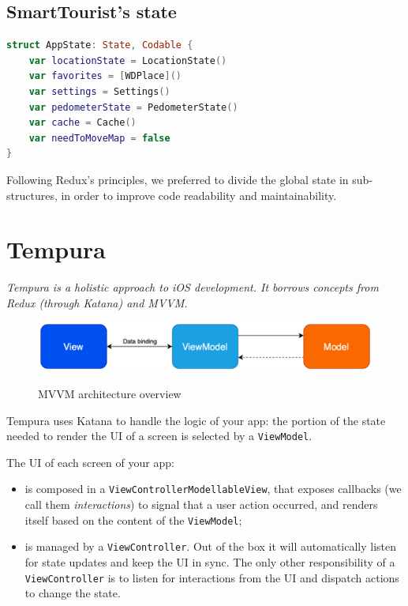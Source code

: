 \documentclass[a4paper, 11pt, parskip=half]{scrreprt}
\theoremstyle{definition}
\newenvironment{linedquote}{
	\begin{mdframed}[style=linedquote]
}{
	\end{mdframed}
}
\begin{document}
\subsection{SmartTourist's state}
		
\begin{lstlisting}[language=swift]
struct AppState: State, Codable {
	var locationState = LocationState()
	var favorites = [WDPlace]()
	var settings = Settings()
	var pedometerState = PedometerState()
	var cache = Cache()
	var needToMoveMap = false
}
\end{lstlisting}

Following Redux's principles, we preferred to divide the global state in sub-structures, in order to improve code readability and maintainability.

\newpage
\section{Tempura}

\begin{linedquote}
    \textit{Tempura is a holistic approach to iOS development. It borrows concepts from Redux (through Katana) and MVVM.}
\end{linedquote}

\begin{figure}[H]
  	\centering
  	\includegraphics[width=0.85\linewidth]{MVVM-light}
  	\label{fig:test1}
	\caption{MVVM architecture overview}
\end{figure}

Tempura uses Katana to handle the logic of your app: the portion of the state needed to render the UI of a screen is selected by a \texttt{ViewModel}.

The UI of each screen of your app:
\begin{itemize}
	\item is composed in a \texttt{ViewControllerModellableView}, that exposes callbacks (we call them \textit{interactions}) to signal that a user action occurred, and renders itself based on the content of the \texttt{ViewModel};
	\item is managed by a \texttt{ViewController}. Out of the box it will automatically listen for state updates and keep the UI in sync. The only other responsibility of a \texttt{ViewController} is to listen for interactions from the UI and dispatch actions to change the state.
\end{itemize}
\end{document}
